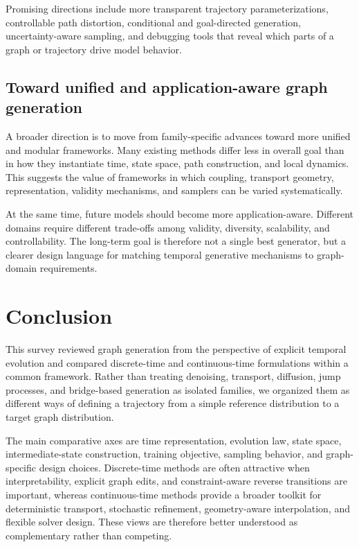 \documentclass{article}
\begin{document}
Promising directions include more transparent trajectory parameterizations, controllable path distortion, conditional and goal-directed generation, uncertainty-aware sampling, and debugging tools that reveal which parts of a graph or trajectory drive model behavior.

\subsection{Toward unified and application-aware graph generation}

A broader direction is to move from family-specific advances toward more unified and modular frameworks. Many existing methods differ less in overall goal than in how they instantiate time, state space, path construction, and local dynamics. This suggests the value of frameworks in which coupling, transport geometry, representation, validity mechanisms, and samplers can be varied systematically.

At the same time, future models should become more application-aware. Different domains require different trade-offs among validity, diversity, scalability, and controllability. The long-term goal is therefore not a single best generator, but a clearer design language for matching temporal generative mechanisms to graph-domain requirements.

\section{Conclusion}
\label{sec:conclusion}

This survey reviewed graph generation from the perspective of explicit temporal evolution and compared discrete-time and continuous-time formulations within a common framework. Rather than treating denoising, transport, diffusion, jump processes, and bridge-based generation as isolated families, we organized them as different ways of defining a trajectory from a simple reference distribution to a target graph distribution.

The main comparative axes are time representation, evolution law, state space, intermediate-state construction, training objective, sampling behavior, and graph-specific design choices. Discrete-time methods are often attractive when interpretability, explicit graph edits, and constraint-aware reverse transitions are important, whereas continuous-time methods provide a broader toolkit for deterministic transport, stochastic refinement, geometry-aware interpolation, and flexible solver design. These views are therefore better understood as complementary rather than competing.
\end{document}
